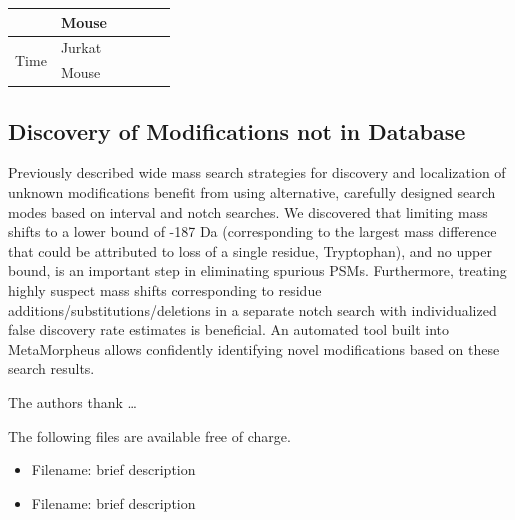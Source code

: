 \documentclass[journal=jprobs,manuscript=article]{achemso}
\begin{document}
\begin{table}[]
\begin{tabular}{|l|l|l|l|l|l|}
                      & Mouse  &                                                      &                                                         &                                                      &                                                         \\ \hline
\multirow{2}{*}{Time} & Jurkat &                                                      &                                                         &                                                      &                                                         \\ \cline{2-6} 
                      & Mouse  &                                                      &                                                         &                                                      &                                                         \\ \hline
\end{tabular}
\end{table}


\subsection{Discovery of Modifications not in Database}

Previously described wide mass search strategies for discovery and localization of unknown modifications benefit from using alternative, carefully designed search modes based on interval and notch searches.
We discovered that limiting mass shifts to a lower bound of -187 Da (corresponding to the largest mass difference that could be attributed to loss of a single residue, Tryptophan), and no upper bound, is an important step in eliminating spurious PSMs.
Furthermore, treating highly suspect mass shifts corresponding to residue additions/substitutions/deletions in a separate notch search with individualized false discovery rate estimates is beneficial.
An automated tool built into MetaMorpheus allows confidently identifying novel modifications based on these search results.


%
\begin{acknowledgement}

The authors thank \ldots
\end{acknowledgement}

\begin{suppinfo}

The following files are available free of charge.
\begin{itemize}
  \item Filename: brief description
  \item Filename: brief description
\end{itemize}

\end{suppinfo}

\newpage


\end{document}
